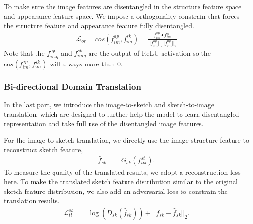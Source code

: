 \documentclass[10pt,twocolumn,letterpaper]{article}
\begin{document}
To make sure the image features are disentangled in the structure feature space and appearance feature space. 
We impose a orthogonality constrain \cite{ridgeway2018learning} that forces the structure feature and appearance feature fully disentangled.
\begin{align}
    \mathcal{L}_{or} = cos(f_{im}^{ap}, f_{im}^{sk}) = \frac{f_{im}^{ap} \bullet f_{im}^{st}}{||f_{im}^{ap}||_2 ||f_{im}^{ap}||_2}
\end{align}
Note that the $f_{img}^{ap}$ and $f_{img}^{sk}$ are the output of ReLU activation so the $cos(f_{im}^{ap}, f_{im}^{sk})$ will always more than $0$. 


\subsubsection{Bi-directional Domain Translation}
In the last part, we introduce the image-to-sketch and sketch-to-image translation, which are designed to further help the model to learn disentangled representation and take full use of the disentangled image features.

For the image-to-sketch translation, we directly use the image structure feature to reconstruct sketch feature,
\begin{align}
    \hat{f}_{sk} &= G_{sk}(f_{im}^{st}).
\end{align}
To measure the quality of the translated results,  we adopt a reconstruction loss here. To make the translated sketch feature distribution similar to the original sketch feature distribution, we also add an adversarial loss to constrain the translation results.
\begin{align}
    \mathcal{L}_{tl}^{sk} =& \log(D_{sk}(\hat{f}_{sk})) + ||f_{sk}-\hat{f}_{sk}||_2.
\end{align}
\end{document}
